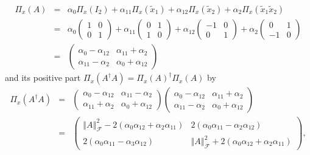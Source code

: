 \documentclass[aps,preprint]{revtex4}
\begin{document}
\begin{eqnarray}
\mathcal{\Pi }_{x}\left( A\right) &=&\alpha _{0}\mathcal{\Pi }_{x}\left(
I_{2}\right) +\alpha _{11}\mathcal{\Pi }_{x}\left( \widetilde{x}_{1}\right)
+\alpha _{12}\mathcal{\Pi }_{x}\left( \widetilde{x}_{2}\right) +\alpha _{2}%
\mathcal{\Pi }_{x}\left( \widetilde{x}_{1}\widetilde{x}_{2}\right) \\
&=&\alpha _{0}\left( 
\begin{array}{cc}
1 & 0 \\ 
0 & 1%
\end{array}%
\right) +\alpha _{11}\left( 
\begin{array}{cc}
0 & 1 \\ 
1 & 0%
\end{array}%
\right) +\alpha _{12}\left( 
\begin{array}{cc}
-1 & 0 \\ 
0 & 1%
\end{array}%
\right) +\alpha _{2}\left( 
\begin{array}{cc}
0 & 1 \\ 
-1 & 0%
\end{array}%
\right) \\
&=&\left( 
\begin{array}{cc}
\alpha _{0}-\alpha _{12} & \alpha _{11}+\alpha _{2} \\ 
\alpha _{11}-\alpha _{2} & \alpha _{0}+\alpha _{12}%
\end{array}%
\right)
\end{eqnarray}%
and its positive part $\mathcal{\Pi }_{x}\left( A^{\dagger }A\right) =%
\mathcal{\Pi }_{x}\left( A\right) ^{\dagger }\mathcal{\Pi }_{x}\left(
A\right) $ by%
\begin{eqnarray}
\mathcal{\Pi }_{x}\left( A^{\dagger }A\right) &=&\left( 
\begin{array}{cc}
\alpha _{0}-\alpha _{12} & \alpha _{11}-\alpha _{2} \\ 
\alpha _{11}+\alpha _{2} & \alpha _{0}+\alpha _{12}%
\end{array}%
\right) \left( 
\begin{array}{cc}
\alpha _{0}-\alpha _{12} & \alpha _{11}+\alpha _{2} \\ 
\alpha _{11}-\alpha _{2} & \alpha _{0}+\alpha _{12}%
\end{array}%
\right) \\
&=&\left( 
\begin{array}{cc}
\left\Vert A\right\Vert _{\mathcal{F}}^{2}-2\left( \alpha _{0}\alpha
_{12}+\alpha _{2}\alpha _{11}\right) & 2\left( \alpha _{0}\alpha
_{11}-\alpha _{2}\alpha _{12}\right) \\ 
2\left( \alpha _{0}\alpha _{11}-\alpha _{3}\alpha _{12}\right) & \left\Vert
A\right\Vert _{\mathcal{F}}^{2}+2\left( \alpha _{0}\alpha _{12}+\alpha
_{2}\alpha _{11}\right)%
\end{array}%
\right) ,
\end{eqnarray}%
\end{document}
